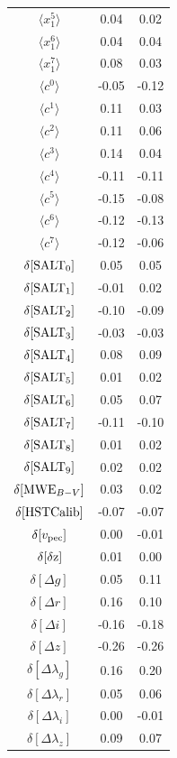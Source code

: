 \documentclass[a4paper,fleqn,usenatbib]{mnras}
\begin{document}
\begin{table}
\begin{tabular}{c|cc}
		$\langle x_1^{5} \rangle$ &    0.04 &      0.02     \\
		$\langle x_1^{6} \rangle$ &    0.04 &      0.04     \\
		$\langle x_1^{7} \rangle$ &    0.08 &      0.03     \\
		$\langle c^{0} \rangle$ &   -0.05 &     -0.12     \\
		$\langle c^{1} \rangle$ &    0.11 &      0.03     \\
		$\langle c^{2} \rangle$ &    0.11 &      0.06     \\
		$\langle c^{3} \rangle$ &    0.14 &      0.04     \\
		$\langle c^{4} \rangle$ &   -0.11 &     -0.11     \\
		$\langle c^{5} \rangle$ &   -0.15 &     -0.08     \\
		$\langle c^{6} \rangle$ &   -0.12 &     -0.13     \\
		$\langle c^{7} \rangle$ &   -0.12 &     -0.06     \\
		$\delta [ {\rm SALT}_0 ]$ &    0.05 &      0.05     \\
		$\delta [ {\rm SALT}_1 ]$ &   -0.01 &      0.02     \\
		$\delta [ {\rm SALT}_2 ]$ &   -0.10 &     -0.09     \\
		$\delta [ {\rm SALT}_3 ]$ &   -0.03 &     -0.03     \\
		$\delta [ {\rm SALT}_4 ]$ &    0.08 &      0.09     \\
		$\delta [ {\rm SALT}_5 ]$ &    0.01 &      0.02     \\
		$\delta [ {\rm SALT}_6 ]$ &    0.05 &      0.07     \\
		$\delta [ {\rm SALT}_7 ]$ &   -0.11 &     -0.10     \\
		$\delta [ {\rm SALT}_8 ]$ &    0.01 &      0.02     \\
		$\delta [ {\rm SALT}_9 ]$ &    0.02 &      0.02     \\
		$\delta [ {\rm MWE}_{B-V} ]$ &    0.03 &      0.02     \\
		$\delta [ {\rm HST Calib} ]$ &   -0.07 &     -0.07     \\
		$\delta [ v_{\rm pec} ]$ &    0.00 &     -0.01     \\
		$\delta [ {\rm \delta z } ]$ &    0.01 &      0.00     \\
		$\delta [ \Delta g ]$ &    0.05 &      0.11     \\
		$\delta [ \Delta r ]$ &    0.16 &      0.10     \\
		$\delta [ \Delta i ]$ &   -0.16 &     -0.18     \\
		$\delta [ \Delta z ]$ &   -0.26 &     -0.26     \\
		$\delta [ \Delta \lambda_g ]$ &    0.16 &      0.20     \\
		$\delta [ \Delta \lambda_r ]$ &    0.05 &      0.06     \\
		$\delta [ \Delta \lambda_i ]$ &    0.00 &     -0.01     \\
		$\delta [ \Delta \lambda_z ]$ &    0.09 &      0.07     \\
		\hline
	\end{tabular}
\end{table}
\end{document}
